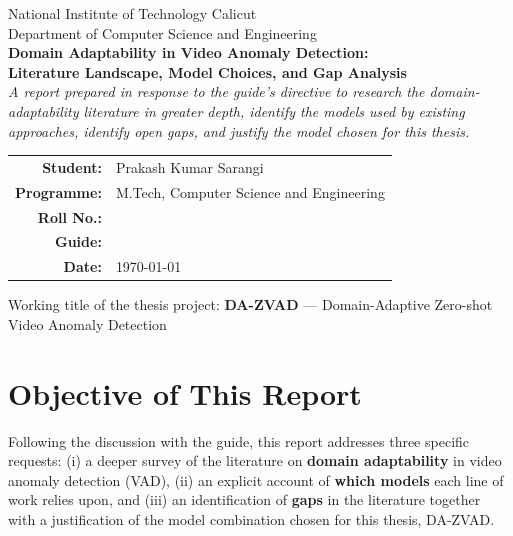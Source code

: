 \documentclass[12pt, a4paper]{article}
\begin{document}
\begin{titlepage}
\centering
\vspace*{1.5cm}

{\large National Institute of Technology Calicut}\\[0.2cm]
{\normalsize Department of Computer Science and Engineering}\\[1.8cm]

{\Large\bfseries Domain Adaptability in Video Anomaly Detection:}\\[0.4cm]
{\Large\bfseries Literature Landscape, Model Choices, and Gap Analysis}\\[1.5cm]

{\normalsize\itshape
A report prepared in response to the guide's directive to research the
domain-adaptability literature in greater depth, identify the models used
by existing approaches, identify open gaps, and justify the model chosen
for this thesis.}\\[2cm]

\begin{tabular}{rl}
    \textbf{Student:}     & Prakash Kumar Sarangi \\
    \textbf{Programme:}   & M.Tech, Computer Science and Engineering \\
    \textbf{Roll No.:}    & \underline{\hspace{4cm}} \\
    \textbf{Guide:}       & \underline{\hspace{4cm}} \\
    \textbf{Date:}        & \today \\
\end{tabular}

\vfill
{\small Working title of the thesis project: \textbf{DA-ZVAD} --- Domain-Adaptive
Zero-shot Video Anomaly Detection}
\end{titlepage}

\section{Objective of This Report}

Following the discussion with the guide, this report addresses three specific
requests: (i) a deeper survey of the literature on \textbf{domain adaptability}
in video anomaly detection (VAD), (ii) an explicit account of \textbf{which
models} each line of work relies upon, and (iii) an identification of
\textbf{gaps} in the literature together with a justification of the model
combination chosen for this thesis, DA-ZVAD.
\end{document}
